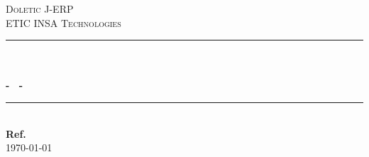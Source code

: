 %
%


\newcommand{\HRule}{\rule{\linewidth}{0.5mm}} %

\center %
 

\vspace*{2cm}

\textsc{\LARGE Doletic J-ERP}\\[1cm] 
\textsc{\Large ETIC INSA Technologies}\\[3cm] 


\HRule \\[0.4cm]
{ \huge \bfseries \mainTitle}\\[0.1cm]
{\large \bfseries - \secondTitle~-} 
\HRule \\[2cm]


{\bf{Ref. \documentRef}}\\[2cm] %


{\large \today}\\[2cm] %
 

